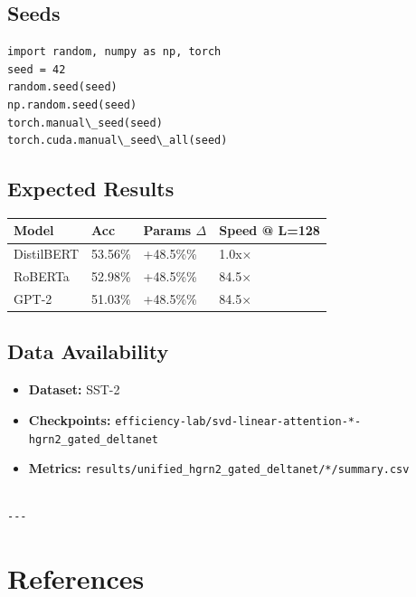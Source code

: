 \subsection{Seeds}

\begin{lstlisting}
import random, numpy as np, torch
seed = 42
random.seed(seed)
np.random.seed(seed)
torch.manual\_seed(seed)
torch.cuda.manual\_seed\_all(seed)
\end{lstlisting}

\subsection{Expected Results}

\begin{table}[H]
\centering
\small
\begin{tabular}{llll}
\toprule
\textbf{Model} & \textbf{Acc} & \textbf{Params $\Delta$} & \textbf{Speed @ L=128} \\
\midrule
DistilBERT & 53.56\% & +48.5\%\% & 1.0x$\times$ \\
RoBERTa & 52.98\% & +48.5\%\% & 84.5$\times$ \\
GPT-2 & 51.03\% & +48.5\%\% & 84.5$\times$ \\
\bottomrule
\end{tabular}
\end{table}

\subsection{Data Availability}

\begin{itemize}
\item \textbf{Dataset:} SST-2
\item \textbf{Checkpoints:} \texttt{efficiency-lab/svd-linear-attention-*-hgrn2\_gated\_deltanet}
\item \textbf{Metrics:} \texttt{results/unified\_hgrn2\_gated\_deltanet/*/summary.csv}
\end{itemize}
\begin{lstlisting}

---
\end{lstlisting}

\section{References}

